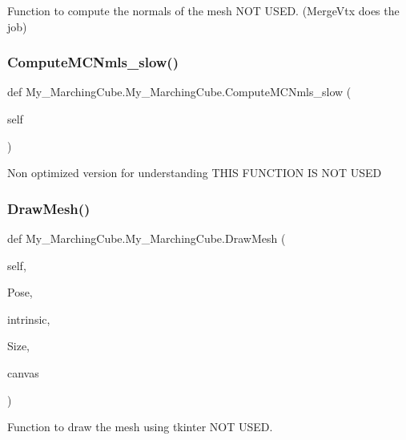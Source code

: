 \begin{DoxyVerb}    Function to compute the normals of the mesh
    NOT USED. (MergeVtx does the job)
\end{DoxyVerb}
 \mbox{\label{class_my___marching_cube_1_1_my___marching_cube_a27d160262d57b10e11ec11978c4fa8ea}} 
\subsubsection{Compute\+M\+C\+Nmls\+\_\+slow()}
{\footnotesize\ttfamily def My\+\_\+\+Marching\+Cube.\+My\+\_\+\+Marching\+Cube.\+Compute\+M\+C\+Nmls\+\_\+slow (\begin{DoxyParamCaption}\item[{}]{self }\end{DoxyParamCaption})}

\begin{DoxyVerb}Non optimized version for understanding
THIS FUNCTION IS NOT USED
\end{DoxyVerb}
 \mbox{\label{class_my___marching_cube_1_1_my___marching_cube_aa6b90ce7e02b9a41c824707630b64f07}} 
\subsubsection{Draw\+Mesh()}
{\footnotesize\ttfamily def My\+\_\+\+Marching\+Cube.\+My\+\_\+\+Marching\+Cube.\+Draw\+Mesh (\begin{DoxyParamCaption}\item[{}]{self,  }\item[{}]{Pose,  }\item[{}]{intrinsic,  }\item[{}]{Size,  }\item[{}]{canvas }\end{DoxyParamCaption})}

\begin{DoxyVerb}    Function to draw the mesh using tkinter
    NOT USED.
\end{DoxyVerb}
 \mbox{\label{class_my___marching_cube_1_1_my___marching_cube_a4b28f492fb09edfca2a4814c86631720}} 
